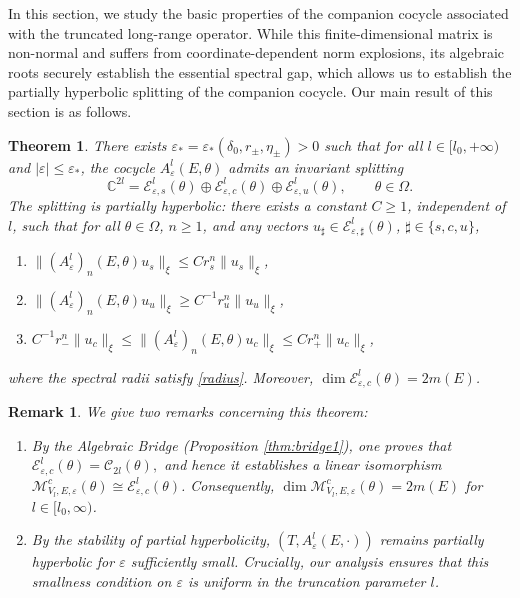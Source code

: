 \documentclass[reqno,11pt]{amsart}
\newtheorem{theorem}{Theorem}[section]
\newtheorem{remark}{Remark}[section]
\begin{document}
In this section, we study the basic properties of the companion cocycle associated with the truncated long-range operator. While this finite-dimensional matrix is non-normal and suffers from coordinate-dependent norm explosions, its algebraic roots securely establish the essential spectral gap, which allows us to establish the  partially hyperbolic splitting  of the companion cocycle.
Our main result of this section is as follows.

\begin{theorem}\label{thm:sec4-main}
There exists $\varepsilon_*=\varepsilon_*(\delta_0, r_\pm,\eta_\pm)>0$ such that for all $l\in[l_0,+\infty)$ and $|\varepsilon|\le\varepsilon_*$, the cocycle $A_{\varepsilon}^{l}(E,\theta)$ admits an invariant splitting
$$
\mathbb{C}^{2l}
=
\mathcal{E}^{l}_{\varepsilon,s}(\theta)
\oplus
\mathcal{E}^{l}_{\varepsilon,c}(\theta)
\oplus
\mathcal{E}^{l}_{\varepsilon,u}(\theta),
\qquad \theta\in\Omega.
$$
The splitting is partially hyperbolic: there exists a constant $C\ge 1$, independent of $l$, such that for all $\theta\in\Omega$, $n\ge 1$, and any vectors $u_\sharp\in\mathcal{E}^{l}_{\varepsilon,\sharp}(\theta)$, $\sharp\in\{s,c,u\}$,
\begin{enumerate}
    \item $\|(A^{l}_\varepsilon)_n(E,\theta) u_s\|_\xi \le C r_s^n \|u_s\|_\xi$,
    \item $\|(A^{l}_\varepsilon)_n(E,\theta) u_u\|_\xi \ge C^{-1} r_u^n \|u_u\|_\xi$,
    \item $C^{-1} r_-^n \|u_c\|_\xi \le \|(A^{l}_\varepsilon)_n(E,\theta) u_c\|_\xi \le C r_+^n \|u_c\|_\xi$,
\end{enumerate}
 where the spectral radii satisfy \eqref{radius}. Moreover, $\dim\mathcal{E}^{l}_{\varepsilon,c}(\theta)=2m(E)$.
\end{theorem}


\begin{remark}We give two remarks concerning this theorem:
\begin{enumerate}
    \item By the Algebraic Bridge (Proposition \ref{thm:bridge1}), one  proves that
$
\mathcal{E}^{l}_{\varepsilon,c}(\theta)=\mathcal{C}_{2l}(\theta),
$
and hence it establishes a  linear isomorphism $\mathcal M_{V_l,E,\varepsilon}^c(\theta) \cong \mathcal{E}^{l}_{\varepsilon,c}(\theta)$. Consequently, $\dim\mathcal M_{V_l,E,\varepsilon}^c(\theta) = 2m(E)$ for $l\in[l_0,\infty)$.
\item By the stability of partial hyperbolicity, $(T, A^{l}_\varepsilon(E,\cdot))$ remains partially hyperbolic for $\varepsilon$ sufficiently small. Crucially, our analysis ensures that this smallness condition on $\varepsilon$ is  uniform in the truncation parameter $l$.
\end{enumerate}

\end{remark}
\end{document}
